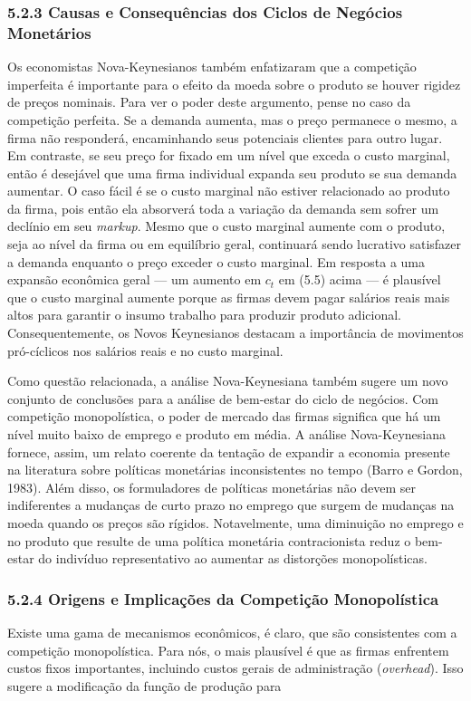 \documentclass[12pt]{article}
\begin{document}
\subsubsection{5.2.3 Causas e Consequências dos Ciclos de Negócios Monetários} Os economistas Nova-Keynesianos também enfatizaram que a competição imperfeita é importante para o efeito da moeda sobre o produto se houver rigidez de preços nominais. Para ver o poder deste argumento, pense no caso da competição perfeita. Se a demanda aumenta, mas o preço permanece o mesmo, a firma não responderá, encaminhando seus potenciais clientes para outro lugar. Em contraste, se seu preço for fixado em um nível que exceda o custo marginal, então é desejável que uma firma individual expanda seu produto se sua demanda aumentar. O caso fácil é se o custo marginal não estiver relacionado ao produto da firma, pois então ela absorverá toda a variação da demanda sem sofrer um declínio em seu \textit{markup}. Mesmo que o custo marginal aumente com o produto, seja ao nível da firma ou em equilíbrio geral, continuará sendo lucrativo satisfazer a demanda enquanto o preço exceder o custo marginal. Em resposta a uma expansão econômica geral — um aumento em $c_t$ em (5.5) acima — é plausível que o custo marginal aumente porque as firmas devem pagar salários reais mais altos para garantir o insumo trabalho para produzir produto adicional. Consequentemente, os Novos Keynesianos destacam a importância de movimentos pró-cíclicos nos salários reais e no custo marginal.

Como questão relacionada, a análise Nova-Keynesiana também sugere um novo conjunto de conclusões para a análise de bem-estar do ciclo de negócios. Com competição monopolística, o poder de mercado das firmas significa que há um nível muito baixo de emprego e produto em média. A análise Nova-Keynesiana fornece, assim, um relato coerente da tentação de expandir a economia presente na literatura sobre políticas monetárias inconsistentes no tempo (Barro e Gordon, 1983). Além disso, os formuladores de políticas monetárias não devem ser indiferentes a mudanças de curto prazo no emprego que surgem de mudanças na moeda quando os preços são rígidos. Notavelmente, uma diminuição no emprego e no produto que resulte de uma política monetária contracionista reduz o bem-estar do indivíduo representativo ao aumentar as distorções monopolísticas.

\subsubsection{5.2.4 Origens e Implicações da Competição Monopolística} Existe uma gama de mecanismos econômicos, é claro, que são consistentes com a competição monopolística. Para nós, o mais plausível é que as firmas enfrentem custos fixos importantes, incluindo custos gerais de administração (\textit{overhead}). Isso sugere a modificação da função de produção para
\end{document}
